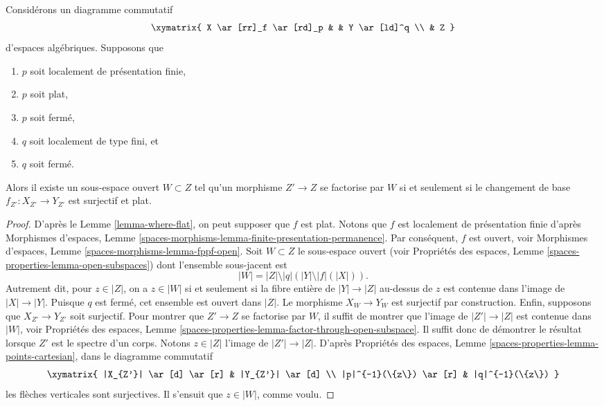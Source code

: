 \begin{lemma}
\label{lemma-where-surjective-flat}
Considérons un diagramme commutatif
$$
\xymatrix{
X \ar[rr]_f \ar[rd]_p & & Y \ar[ld]^q \\
& Z
}
$$
d'espaces algébriques. Supposons que
\begin{enumerate}
\item $p$ soit localement de présentation finie,
\item $p$ soit plat,
\item $p$ soit fermé,
\item $q$ soit localement de type fini, et
\item $q$ soit fermé.
\end{enumerate}
Alors il existe un sous-espace ouvert $W \subset Z$
tel qu'un morphisme $Z' \to Z$ se factorise par $W$ si et seulement si le
changement de base $f_{Z'} : X_{Z'} \to Y_{Z'}$ est surjectif et plat.
\end{lemma}

\begin{proof}
D'après le
Lemme \ref{lemma-where-flat},
on peut supposer que $f$ est plat.
Notons que $f$ est localement de présentation finie d'après
Morphismes d'espaces,
Lemme \ref{spaces-morphisms-lemma-finite-presentation-permanence}.
Par conséquent, $f$ est ouvert, voir
Morphismes d'espaces, Lemme \ref{spaces-morphisms-lemma-fppf-open}.
Soit $W \subset Z$ le sous-espace ouvert (voir
Propriétés des espaces, Lemme
\ref{spaces-properties-lemma-open-subspaces})
dont l'ensemble sous-jacent est
$$
|W| = |Z| \setminus |q|\left(|Y| \setminus |f|(|X|)\right).
$$
Autrement dit, pour $z \in |Z|$, on a $z \in |W|$ si et seulement
si la fibre entière de $|Y| \to |Z|$ au-dessus de $z$ est contenue dans l'image de
$|X| \to |Y|$. Puisque $q$ est fermé, cet ensemble est ouvert dans $|Z|$.
Le morphisme $X_W \to Y_W$ est surjectif par construction.
Enfin, supposons que $X_{Z'} \to Y_{Z'}$ soit surjectif.
Pour montrer que $Z' \to Z$ se factorise par $W$, il suffit de montrer
que l'image de $|Z'| \to |Z|$ est contenue dans $|W|$, voir
Propriétés des espaces, Lemme
\ref{spaces-properties-lemma-factor-through-open-subspace}.
Il suffit donc de démontrer le résultat lorsque $Z'$ est le spectre d'un corps.
Notons $z \in |Z|$ l'image de $|Z'| \to |Z|$. D'après
Propriétés des espaces,
Lemme \ref{spaces-properties-lemma-points-cartesian},
dans le diagramme commutatif
$$
\xymatrix{
|X_{Z'}| \ar[d] \ar[r] &
|Y_{Z'}| \ar[d] \\
|p|^{-1}(\{z\}) \ar[r] &
|q|^{-1}(\{z\})
}
$$
les flèches verticales sont surjectives. Il s'ensuit que $z \in |W|$, comme voulu.
\end{proof}

